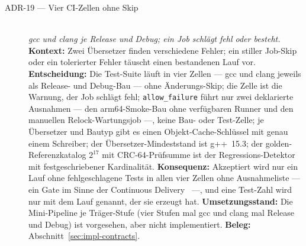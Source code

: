 \begin{description}
  \item[ADR-19 --- Vier CI-Zellen ohne Skip]\hfill\\
  \emph{gcc und clang je Release und Debug; ein Job schlägt fehl oder besteht.}\hfill\\
  \textbf{Kontext:} Zwei Übersetzer finden verschiedene Fehler; ein stiller Job-Skip oder ein
  tolerierter Fehler täuscht einen bestandenen Lauf vor.
  \textbf{Entscheidung:} Die Test-Suite läuft in vier Zellen --- gcc und clang jeweils als Release-
  und Debug-Bau --- ohne Änderungs-Skip; die Zelle ist die Warnung, der Job schlägt fehl;
  \texttt{allow\_failure} führt nur zwei deklarierte Ausnahmen --- den arm64-Smoke-Bau ohne
  verfügbaren Runner und den manuellen Relock-Wartungsjob ---, keine Bau- oder Test-Zelle; je
  Übersetzer und Bautyp gibt es einen Objekt-Cache-Schlüssel mit genau einem Schreiber; der
  Übersetzer-Mindeststand ist g++~15.3; der golden-Referenzkatalog $2^{17}$ mit CRC-64-Prüfsumme ist
  der Regressions-Detektor mit festgeschriebener Kardinalität.
  \textbf{Konsequenz:} Akzeptiert wird nur ein Lauf ohne fehlgeschlagene Tests in allen vier Zellen ohne
  Ausnahmeliste --- ein Gate im Sinne der Continuous Delivery~\cite{humble2010cd} ---, und eine
  Test-Zahl wird nur mit dem Lauf genannt, der sie erzeugt hat.
  \textbf{Umsetzungsstand:} Die Mini-Pipeline je Träger-Stufe (vier Stufen mal gcc und clang mal Release
  und Debug) ist vorgesehen, aber nicht implementiert.
  \textbf{Beleg:} Abschnitt~\ref{sec:impl-contracts}.


\end{description}
